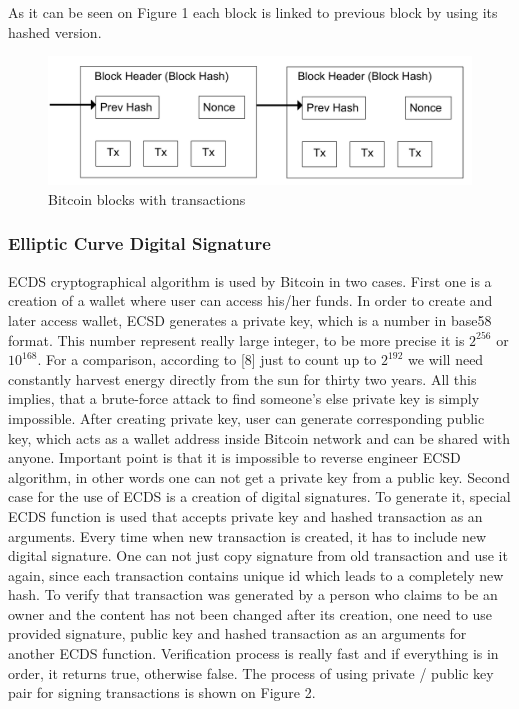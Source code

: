 \documentclass[conference,compsoc]{IEEEtran}
\begin{document}
As it can be seen on Figure 1 each block is linked to previous block by using its hashed version. 

\begin{figure}[h!]
  \centering
  \includegraphics[width=.45\textwidth]{graphics/blocks.png}
  \caption{Bitcoin blocks with transactions}
  \label{fig:fig1}
\end{figure}

\subsubsection{Elliptic Curve Digital Signature}
ECDS cryptographical algorithm is used by Bitcoin in two cases. 
First one is a creation of a wallet where user can access his/her funds.
In order to create and later access wallet, ECSD generates a private key, which is a number in base58 format. This number represent really large integer, to be more precise it is $2^{256}$ or $10^{168}$. 
For a comparison, according to [8] just to count up to $2^{192}$ we will need constantly harvest energy directly from the sun for thirty two years. 
All this implies, that a brute-force attack to find someone's else private key is simply impossible. 
After creating private key, user can generate corresponding public key, which acts as a wallet address inside Bitcoin network and can be shared with anyone. 
Important point is that it is impossible to reverse engineer ECSD algorithm, in other words one can not get a private key from a public key.
Second case for the use of ECDS is a creation of digital signatures.
To generate it, special ECDS function is used that accepts private key and hashed transaction as an arguments. 
Every time when new transaction is created, it has to include new digital signature.
One can not just copy signature from old transaction and use it again, since each transaction contains unique id which leads to a completely new hash.  
To verify that transaction was generated by a person who claims to be an owner and the content has not been changed after its creation, one need to use provided signature, public key and hashed transaction as an arguments for another ECDS function. 
Verification process is really fast and if everything is in order, it returns true, otherwise false.
The process of using private / public key pair for signing transactions is shown on Figure 2.
\end{document}
